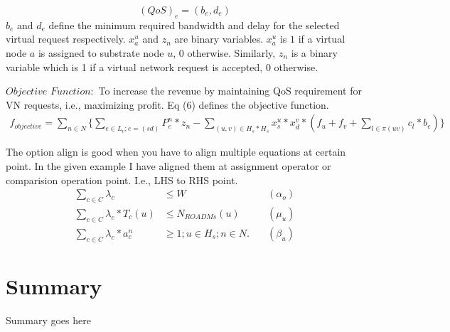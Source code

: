 \begin{equation}
(QoS)_e = (b_e, d_e)
\end{equation}
$b_e$ and $d_e$ define the minimum required bandwidth and delay for the selected virtual request respectively.
$x_a^u$ and $z_n$ are binary variables. $x_a^u$ is $1$ if a virtual node $a$ is assigned to substrate node $u$, 0 otherwise. Similarly, $z_n$ is a binary variable which is 1 if a virtual network request is accepted, 0 otherwise.\par
$Objective$ $Function:$
To increase the revenue by maintaining QoS requirement for VN requests, i.e., maximizing profit. Eq (6) defines the objective function.
 \begin{multline}
f_{objective} = \sum_{n \in N} \Bigg\{\sum_{e\in L_v; e=(sd)}  P_e^n *z_n - 
\sum_{ (u,v) \in H_s * H_s} x_s^u * x_d^v * (f_u + f_v + \sum_{l \in \pi(uv)}c_l * b_e)\Bigg\}
\end{multline}

The option align is good when you have to align multiple equations at certain point. In the given example I have aligned them at assignment operator or comparision operation point. I.e., LHS to RHS point.
\begin{align} 
\sum_{c \in C} \lambda_c &\leqslant W \quad &(\alpha_o) \label{eq:3} \\
\sum_{c \in C} \lambda_c * T_c(u) &\leqslant N_{ROADMs}(u) \quad &(\mu_u) \label{eq:4}\\
\sum_{c \in C} \lambda_c * a_c^n &\geqslant 1 ; u \in H_s ; n \in N. \quad &(\beta_u) \label{eq:5}
\end{align}

\section{Summary}
Summary goes here